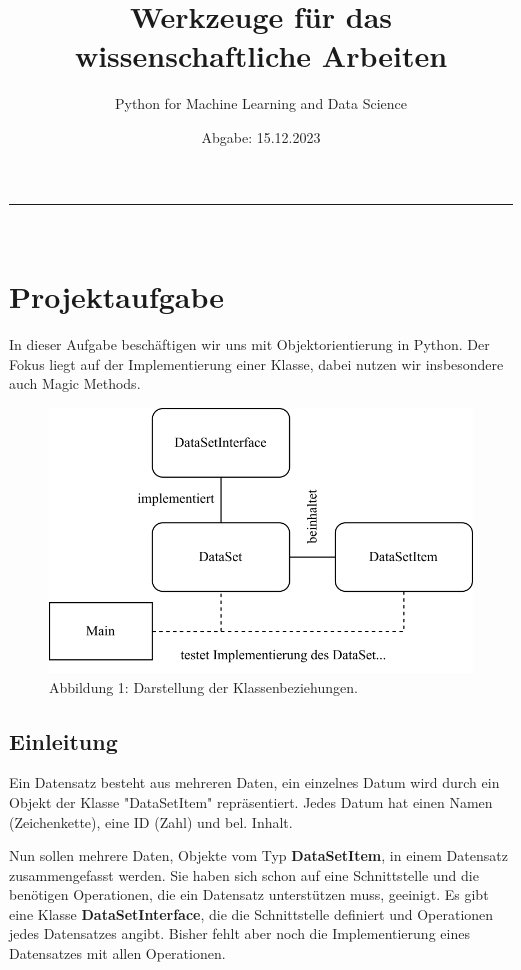 \documentclass[12pt]{article}
\title {Werkzeuge für das wissenschaftliche Arbeiten}
\author{Python for Machine Learning and Data Science}
\date{Abgabe: 15.12.2023}
\begin{document}
\nocite{*}


\maketitle
\hrule\hfill\\[0.2cm]
\tableofcontents
\newpage

\section {Projektaufgabe}
In dieser Aufgabe beschäftigen wir uns mit Objektorientierung in Python. Der Fokus liegt auf der Implementierung einer Klasse, dabei nutzen wir insbesondere auch Magic Methods.

\begin{figure}[htbp]
    \centering
    \includegraphics{./../diagram/classes_files.png}
    \caption{Abbildung 1: Darstellung der Klassenbeziehungen.}
\end{figure}

\subsection{Einleitung}
Ein Datensatz besteht aus mehreren Daten, ein einzelnes Datum wird durch ein Objekt der Klasse "DataSetItem" repräsentiert.
Jedes Datum hat einen Namen (Zeichenkette), eine ID (Zahl) und bel. Inhalt.

Nun sollen mehrere Daten, Objekte vom Typ \textbf{DataSetItem}, in einem Datensatz zusammengefasst werden.
Sie haben sich schon auf eine Schnittstelle und die benötigen Operationen, die ein Datensatz unterstützen muss, geeinigt.
Es gibt eine Klasse \textbf{DataSetInterface}, die die Schnittstelle definiert und Operationen jedes Datensatzes angibt.
Bisher fehlt aber noch die Implementierung eines Datensatzes mit allen Operationen.
\end{document}
